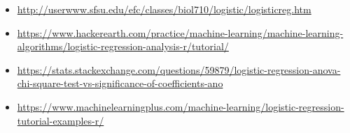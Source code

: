 \documentclass[]{article}
\providecommand{\tightlist}{%
  \setlength{\itemsep}{0pt}\setlength{\parskip}{0pt}}
\begin{document}
\begin{itemize}
\tightlist
\item
  \url{http://userwww.sfsu.edu/efc/classes/biol710/logistic/logisticreg.htm}
\item
  \url{https://www.hackerearth.com/practice/machine-learning/machine-learning-algorithms/logistic-regression-analysis-r/tutorial/}
\item
  \url{https://stats.stackexchange.com/questions/59879/logistic-regression-anova-chi-square-test-vs-significance-of-coefficients-ano}
\item
  \url{https://www.machinelearningplus.com/machine-learning/logistic-regression-tutorial-examples-r/}
\end{itemize}
\end{document}
